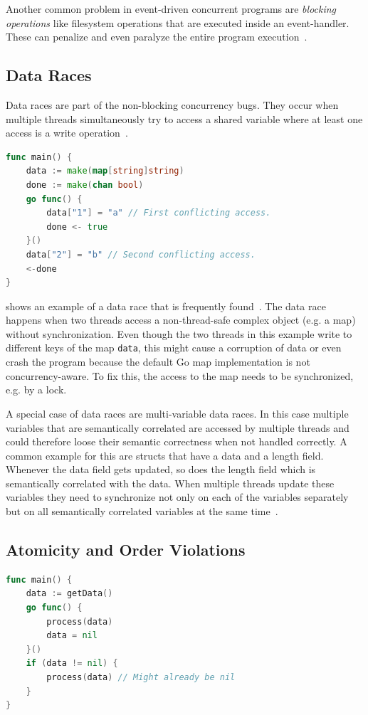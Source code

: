 \documentclass[conference]{IEEEtran}
\begin{document}
Another common problem in event-driven concurrent programs are \emph{blocking operations} like filesystem operations that are executed inside an event-handler.
These can penalize and even paralyze the entire program execution~\cite{tchamgoue2012testing}.

\subsection{Data Races}

Data races are part of the non-blocking concurrency bugs.
They occur when multiple threads simultaneously try to access a shared variable where at least one access is a write operation~\cite{serebry2009threadsanitizer}.

\begin{lstlisting}[float=h, language=Go, label=lst:race, caption=Data race by concurrently accessing a map]
func main() {
	data := make(map[string]string)
	done := make(chan bool)
	go func() {
		data["1"] = "a" // First conflicting access.
		done <- true
	}()
	data["2"] = "b" // Second conflicting access.
	<-done
}
\end{lstlisting}

 shows an example of a data race that is frequently found~\cite{serebry2009threadsanitizer}.
The data race happens when two threads access a non-thread-safe complex object (e.g. a map) without synchronization.
Even though the two threads in this example write to different keys of the map \lstinline{data}, this might cause a corruption of data or even crash the program because the default Go map implementation is not concurrency-aware.
To fix this, the access to the map needs to be synchronized, e.g. by a lock.

A special case of data races are multi-variable data races.
In this case multiple variables that are semantically correlated are accessed by multiple threads and could therefore loose their semantic correctness when not handled correctly.
A common example for this are structs that have a data and a length field.
Whenever the data field gets updated, so does the length field which is semantically correlated with the data.
When multiple threads update these variables they need to synchronize not only on each of the variables separately but on all semantically correlated variables at the same time~\cite{lu2007muvi}.

\subsection{Atomicity and Order Violations}
\begin{lstlisting}[float=h, language=Go, label=lst:order, caption=Test-and-Use bug pattern -- Order violation]
func main() {
    data := getData()
    go func() {
        process(data)
        data = nil
    }()
    if (data != nil) {
        process(data) // Might already be nil
    }
}
\end{lstlisting}
\end{document}
